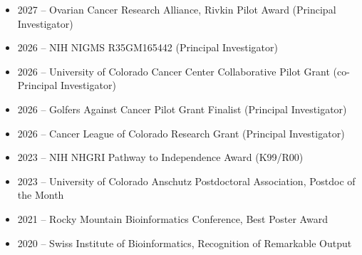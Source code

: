 \begin{itemize}
    \item 2027 -- Ovarian Cancer Research Alliance, Rivkin Pilot Award (Principal Investigator)
    \item 2026 -- NIH NIGMS R35GM165442 (Principal Investigator)
    \item 2026 -- University of Colorado Cancer Center Collaborative Pilot Grant (co-Principal Investigator)
    \item 2026 -- Golfers Against Cancer Pilot Grant Finalist (Principal Investigator)
    \item 2026 -- Cancer League of Colorado Research Grant (Principal Investigator)
    \item 2023 -- NIH NHGRI Pathway to Independence Award (K99/R00)
    \item 2023 -- University of Colorado Anschutz Postdoctoral Association, Postdoc of the Month
    \item 2021 -- Rocky Mountain Bioinformatics Conference, Best Poster Award
    \item 2020 -- Swiss Institute of Bioinformatics, Recognition of Remarkable Output
\end{itemize}
